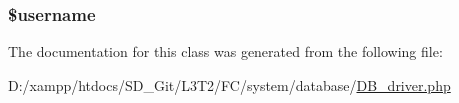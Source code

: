 \subsubsection[{\$username}]{\setlength{\rightskip}{0pt plus 5cm}\$username}\label{class_c_i___d_b__driver_a0eb82aa5f81cf845de4b36cd653c42cf}


The documentation for this class was generated from the following file\+:\begin{DoxyCompactItemize}
\item 
D\+:/xampp/htdocs/\+S\+D\+\_\+\+Git/\+L3\+T2/\+F\+C/system/database/\hyperlink{_d_b__driver_8php}{D\+B\+\_\+driver.\+php}\end{DoxyCompactItemize}
